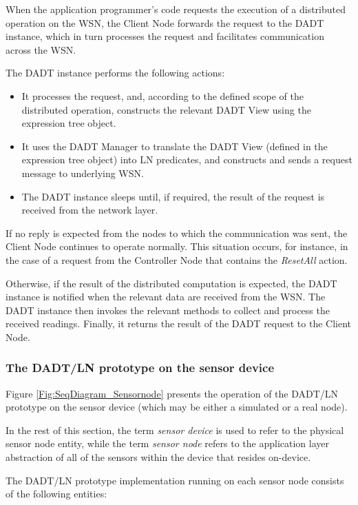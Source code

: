 When the application programmer's code requests the execution of a distributed operation
on the WSN, the Client Node forwards the request to the DADT instance, which in turn
processes the request and facilitates communication across the WSN.

The DADT instance performs the following actions:
  \begin{itemize} 
    \item It processes the request, and, according to the defined scope of the
    distributed operation, constructs the relevant DADT View using the
    expression tree object.
    \item It uses the DADT Manager to translate the DADT View
    (defined in the expression tree object) into LN predicates, and constructs and sends a request message to
    underlying WSN.
    \item The DADT instance sleeps until, if required, the result of
    the request is received from the network layer.
  \end{itemize}
  
If no reply is expected from the nodes to which the communication was sent, the Client Node continues to operate normally. This situation occurs, for instance, in the case of a request from the Controller Node
that contains the \emph{ResetAll} action. 
 
Otherwise, if the result of the distributed computation is expected, the DADT
instance is notified when the relevant data are received from the WSN.
The DADT instance then invokes the relevant methods to collect and process the received
readings. Finally, it returns the result of the DADT request to
the Client Node.

\subsubsection{The DADT/LN prototype on the sensor device} \label{subsubsec:DADTLNSensorDevice}

Figure \ref{Fig:SeqDiagram_Sensornode} presents the operation of the DADT/LN
prototype on the sensor device (which may be either a simulated or a real
node).

In the rest of this section, the term \emph{sensor device} is used to refer to the
physical sensor node entity, while the term \emph{sensor node} refers to the application
layer abstraction of all of the sensors within the device that resides on-device.

The DADT/LN prototype implementation running on each sensor node consists of the
following entities:

